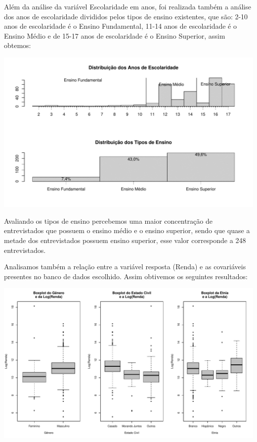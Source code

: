 \documentclass[]{article}
\begin{document}
Além da análise da variável Escolaridade em anos, foi realizada também a
análise dos anos de escolaridade divididos pelos tipos de ensino
existentes, que são: 2-10 anos de escolaridade é o Ensino Fundamental,
11-14 anos de escolaridade é o Ensino Médio e de 15-17 anos de
escolaridade é o Ensino Superior, assim obtemos:

\begin{flushleft}\includegraphics{Relatorio_IC_files/figure-latex/unnamed-chunk-8-1} \end{flushleft}

Avaliando os tipos de ensino percebemos uma maior concentração de
entrevistados que possuem o ensino médio e o ensino superior, sendo que
quase a metade dos entrevistados possuem ensino superior, esse valor
corresponde a 248 entrevistados.

Analisamos também a relação entre a variável resposta (Renda) e as
covariáveis presentes no banco de dados escolhido. Assim obtivemos os
seguintes resultados:

\begin{flushleft}\includegraphics{Relatorio_IC_files/figure-latex/unnamed-chunk-9-1} \end{flushleft}
\end{document}
